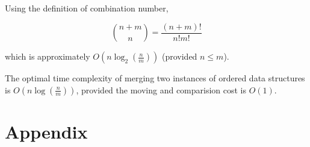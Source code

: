 \documentclass[12pt]{article}
\begin{document}
Using the definition of combination number, 

\begin{equation}
    \binom{n+m}{n} = \frac{(n+m)!}{n!m!}
\end{equation}

which is approximately $O(n\log_2{(\frac{n}{m})})$ (provided $n\le m$).

\begin{tcolorbox}[title = Theorem]
    The optimal time complexity of merging two instances of ordered data structures is $O(n\log{(\frac{n}{m})})$, provided the moving and comparision cost is $O(1)$.
\end{tcolorbox}

\section*{Appendix}


%






\end{document}
